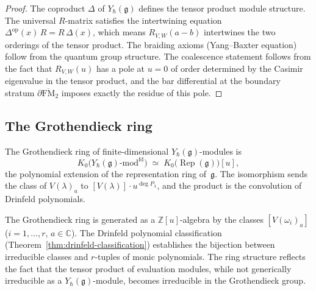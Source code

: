 \begin{proof}
The coproduct $\Delta$ of $Y_\hbar(\mathfrak{g})$ defines
the tensor product module structure. The universal
$R$-matrix satisfies the intertwining equation
$\Delta^{\mathrm{op}}(x)\,R=R\,\Delta(x)$, which means
$R_{V,W}(a-b)$ intertwines the two orderings of the
tensor product. The braiding axioms (Yang--Baxter equation)
follow from the quantum group structure. The coalescence
statement follows from the fact that $R_{V,W}(u)$ has a
pole at $u=0$ of order determined by the Casimir eigenvalue
in the tensor product, and the bar differential at the
boundary stratum $\partial\overline{\mathrm{FM}}_2$
imposes exactly the residue of this pole.
\end{proof}

\subsection{The Grothendieck ring}

\begin{theorem}
\label{thm:grothendieck-yangian}
The Grothendieck ring of finite-dimensional
$Y_\hbar(\mathfrak{g})$-modules is
\begin{equation}\label{eq:grothendieck-yangian}
K_0\!\bigl(Y_\hbar(\mathfrak{g})\text{-}\mathrm{mod}^{\mathrm{fd}}\bigr)
\;\simeq\;
K_0\!\bigl(\operatorname{Rep}(\mathfrak{g})\bigr)[u],
\end{equation}
the polynomial extension of the representation ring
of~$\mathfrak{g}$. The isomorphism sends the class of
$V(\lambda)_a$ to $[V(\lambda)]\cdot u^{\deg P_\lambda}$,
and the product is the convolution of Drinfeld polynomials.
\end{theorem}

\begin{remark}
The Grothendieck ring is generated as a
$\mathbb{Z}[u]$-algebra by the classes
$[V(\omega_i)_a]$ ($i=1,\dots,r$, $a\in\mathbb{C}$).
The Drinfeld polynomial classification
(Theorem~\ref{thm:drinfeld-classification}) establishes
the bijection between irreducible classes and
$r$-tuples of monic polynomials. The ring structure
reflects the fact that the tensor product of evaluation
modules, while not generically irreducible as a
$Y_\hbar(\mathfrak{g})$-module, becomes irreducible in the
Grothendieck group.
\end{remark}

